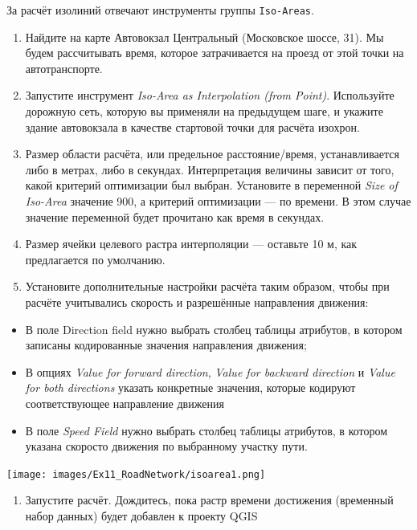 \documentclass[
  12pt,
]{book}
\providecommand{\tightlist}{%
  \setlength{\itemsep}{0pt}\setlength{\parskip}{0pt}}
\begin{document}
За расчёт изолиний отвечают инструменты группы \texttt{Iso-Areas}.

\begin{enumerate}
\def\labelenumi{\arabic{enumi}.}
\item
  Найдите на карте Автовокзал Центральный (Московское шоссе, 31). Мы будем рассчитывать время, которое затрачивается на проезд от этой точки на автотранспорте.
\item
  Запустите инструмент \emph{Iso-Area as Interpolation (from Point)}. Используйте дорожную сеть, которую вы применяли на предыдущем шаге, и укажите здание автовокзала в качестве стартовой точки для расчёта изохрон.
\item
  Размер области расчёта, или предельное расстояние/время, устанавливается либо в метрах, либо в секундах. Интерпретация величины зависит от того, какой критерий оптимизации был выбран. Установите в переменной \emph{Size of Iso-Area} значение 900, а критерий оптимизации --- по времени. В этом случае значение переменной будет прочитано как время в секундах.
\item
  Размер ячейки целевого растра интерполяции --- оставьте 10 м, как предлагается по умолчанию.
\item
  Установите дополнительные настройки расчёта таким образом, чтобы при расчёте учитывались скорость и разрешённые направления движения:
\end{enumerate}

\begin{itemize}
\tightlist
\item
  В поле Direction field нужно выбрать столбец таблицы атрибутов, в котором записаны кодированные значения направления движения;
\item
  В опциях \emph{Value for forward direction}, \emph{Value for backward direction} и \emph{Value for both directions} указать конкретные значения, которые кодируют соответствующее направление движения
\item
  В поле \emph{Speed Field} нужно выбрать столбец таблицы атрибутов, в котором указана скоросто движения по выбранному участку пути.
\end{itemize}

\texttt{[image: images/Ex11\_RoadNetwork/isoarea1.png]}

\begin{enumerate}
\def\labelenumi{\arabic{enumi}.}
\setcounter{enumi}{5}
\tightlist
\item
  Запустите расчёт. Дождитесь, пока растр времени достижения (временный набор данных) будет добавлен к проекту QGIS
\end{enumerate}
\end{document}
